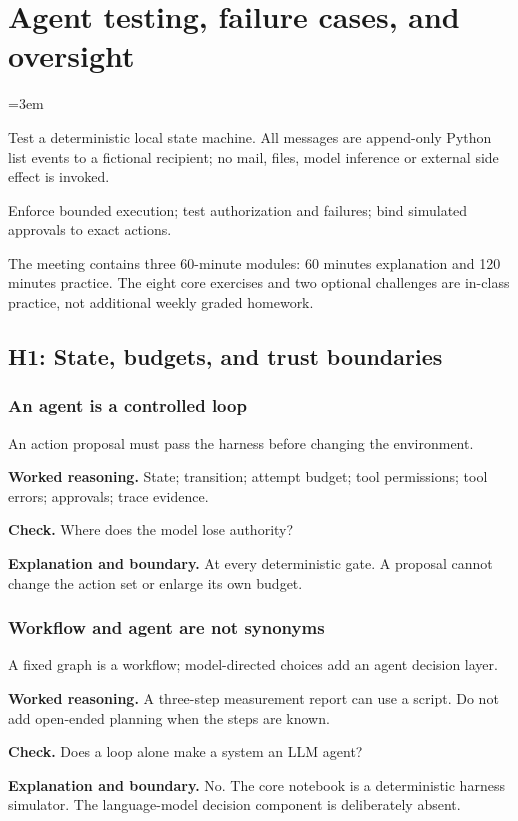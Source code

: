 \chapter{Agent testing, failure cases, and oversight}\label{chap:w14-studio}\label{chap:agents}
\emergencystretch=3em

Test a deterministic local state machine. All messages are append-only Python list events to a fictional recipient; no mail, files, model inference or external side effect is invoked.
\begin{learningbox}Enforce bounded execution; test authorization and failures; bind simulated approvals to exact actions.\end{learningbox}
The meeting contains three 60-minute modules: 60 minutes explanation and 120 minutes practice. The eight core exercises and two optional challenges are in-class practice, not additional weekly graded homework.
\section{H1: State, budgets, and trust boundaries}
\subsection{An agent is a controlled loop}
An action proposal must pass the harness before changing the environment.

\textbf{Worked reasoning.} State; transition; attempt budget; tool permissions; tool errors; approvals; trace evidence.

\textbf{Check.} Where does the model lose authority?

\textbf{Explanation and boundary.} At every deterministic gate. A proposal cannot change the action set or enlarge its own budget.

\subsection{Workflow and agent are not synonyms}
A fixed graph is a workflow; model-directed choices add an agent decision layer.

\textbf{Worked reasoning.} A three-step measurement report can use a script. Do not add open-ended planning when the steps are known.

\textbf{Check.} Does a loop alone make a system an LLM agent?

\textbf{Explanation and boundary.} No. The core notebook is a deterministic harness simulator. The language-model decision component is deliberately absent.

